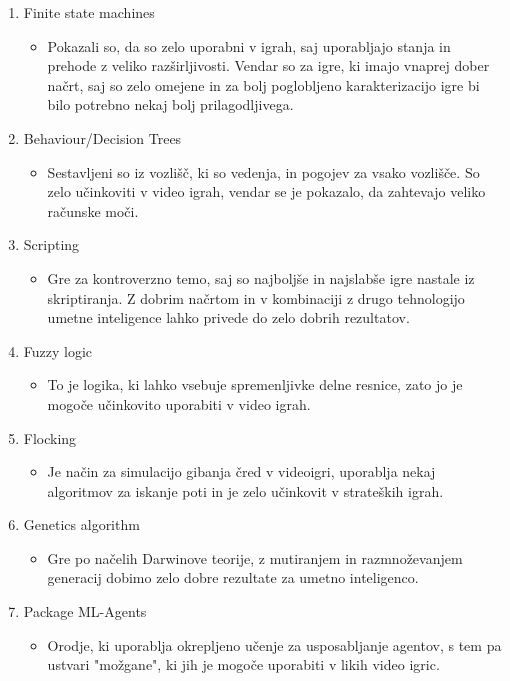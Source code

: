\documentclass[a4paper, 12pt]{book}
\begin{document}
\begin{enumerate}
    \item Finite state machines
        \begin{itemize}
            \item Pokazali so, da so zelo uporabni v igrah, saj uporabljajo stanja in prehode z veliko razširljivosti. Vendar so za igre, ki imajo vnaprej dober načrt, saj so zelo omejene in za bolj poglobljeno karakterizacijo igre bi bilo potrebno nekaj bolj prilagodljivega.
        \end{itemize}
    \item Behaviour/Decision Trees
        \begin{itemize}
            \item Sestavljeni so iz vozlišč, ki so vedenja, in pogojev za vsako vozlišče. So zelo učinkoviti v video igrah, vendar se je pokazalo, da zahtevajo veliko računske moči.
        \end{itemize}
    \item Scripting
        \begin{itemize}
            \item Gre za kontroverzno temo, saj so najboljše in najslabše igre nastale iz skriptiranja. Z dobrim načrtom in v kombinaciji z drugo tehnologijo umetne inteligence lahko privede do zelo dobrih rezultatov.
        \end{itemize}
    \item Fuzzy logic
        \begin{itemize}
            \item To je logika, ki lahko vsebuje spremenljivke delne resnice, zato jo je mogoče učinkovito uporabiti v video igrah.
        \end{itemize}
    \item Flocking
        \begin{itemize}
            \item Je način za simulacijo gibanja čred v videoigri, uporablja nekaj algoritmov za iskanje poti in je zelo učinkovit v strateških igrah.
        \end{itemize}
    \item Genetics algorithm
        \begin{itemize}
            \item Gre po načelih Darwinove teorije, z mutiranjem in razmnoževanjem generacij dobimo zelo dobre rezultate za umetno inteligenco.
        \end{itemize}
    \item Package ML-Agents
        \begin{itemize}
            \item Orodje, ki uporablja okrepljeno učenje za usposabljanje agentov, s tem pa ustvari "možgane", ki jih je mogoče uporabiti v likih video igric.
        \end{itemize}
\end{enumerate}
\end{document}
